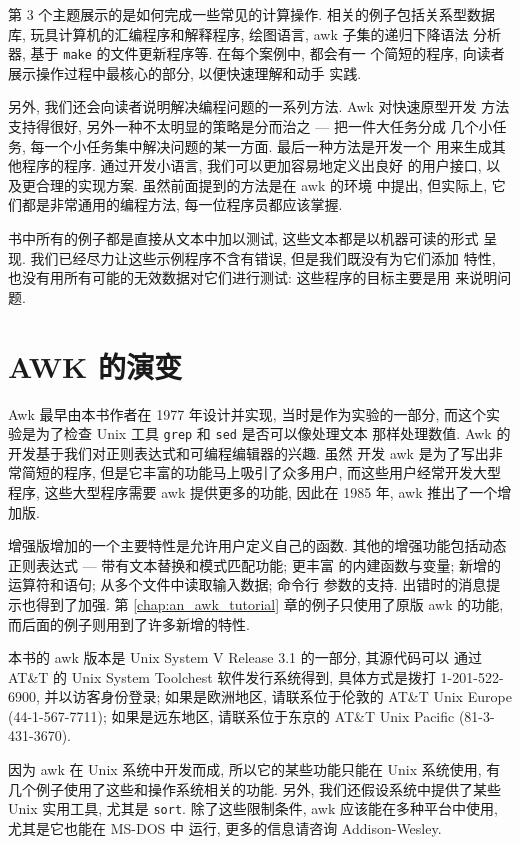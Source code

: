 第 3 个主题展示的是如何完成一些常见的计算操作. 相关的例子包括关系型数据
库, 玩具计算机的汇编程序和解释程序, 绘图语言, awk 子集的递归下降语法
分析器, 基于 \texttt{make} 的文件更新程序等. 在每个案例中, 都会有一
个简短的程序, 向读者展示操作过程中最核心的部分, 以便快速理解和动手
实践.

另外, 我们还会向读者说明解决编程问题的一系列方法. Awk 对快速原型开发
方法支持得很好, 另外一种不太明显的策略是分而治之 --- 把一件大任务分成
几个小任务, 每一个小任务集中解决问题的某一方面. 最后一种方法是开发一个
用来生成其他程序的程序. 通过开发小语言, 我们可以更加容易地定义出良好
的用户接口, 以及更合理的实现方案. 虽然前面提到的方法是在 awk 的环境
中提出, 但实际上, 它们都是非常通用的编程方法, 每一位程序员都应该掌握.

书中所有的例子都是直接从文本中加以测试, 这些文本都是以机器可读的形式
呈现. 我们已经尽力让这些示例程序不含有错误, 但是我们既没有为它们添加
特性, 也没有用所有可能的无效数据对它们进行测试: 这些程序的目标主要是用
来说明问题.

\section*{AWK 的演变}

Awk 最早由本书作者在 1977 年设计并实现, 当时是作为实验的一部分, 而这个实
验是为了检查 Unix 工具 \texttt{grep} 和 \texttt{sed} 是否可以像处理文本
那样处理数值. Awk 的开发基于我们对正则表达式和可编程编辑器的兴趣. 虽然 
开发 awk 是为了写出非常简短的程序, 但是它丰富的功能马上吸引了众多用户,
而这些用户经常开发大型程序, 这些大型程序需要 awk 提供更多的功能, 因此在
1985 年, awk 推出了一个增加版.

增强版增加的一个主要特性是允许用户定义自己的函数.
其他的增强功能包括动态正则表达式 --- 带有文本替换和模式匹配功能; 更丰富
的内建函数与变量; 新增的运算符和语句; 从多个文件中读取输入数据; 命令行 
参数的支持. 出错时的消息提示也得到了加强. 第 \ref{chap:an_awk_tutorial}
章的例子只使用了原版 awk 的功能, 而后面的例子则用到了许多新增的特性.

本书的 awk 版本是 Unix System V Release 3.1 的一部分, 其源代码可以
通过 AT\&T 的 Unix System Toolchest 软件发行系统得到, 具体方式是拨打
1-201-522-6900, 并以访客身份登录; 如果是欧洲地区, 请联系位于伦敦的 AT\&T
Unix Europe (44-1-567-7711); 如果是远东地区, 请联系位于东京的
AT\&T Unix Pacific (81-3-431-3670).

因为 awk 在 Unix 系统中开发而成, 所以它的某些功能只能在 Unix 系统使用,
有几个例子使用了这些和操作系统相关的功能.
另外, 我们还假设系统中提供了某些 Unix 实用工具, 尤其是  \texttt{sort}.
除了这些限制条件, awk 应该能在多种平台中使用, 尤其是它也能在 MS-DOS 中
运行, 更多的信息请咨询 Addison-Wesley.

